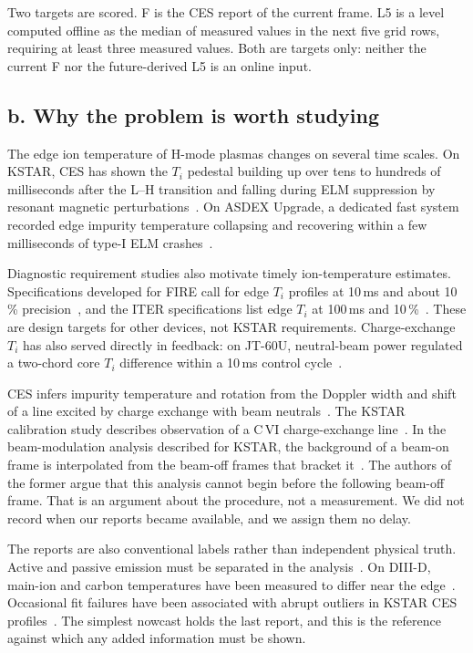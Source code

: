 \documentclass[11pt,a4paper]{article}
\begin{document}
Two targets are scored. F is the CES report of the current frame. L5 is a level computed offline as the median of measured values in the next five grid rows, requiring at least three measured values. Both are targets only: neither the current F nor the future-derived L5 is an online input.

\subsection*{b. Why the problem is worth studying}
The edge ion temperature of H-mode plasmas changes on several time scales. On KSTAR, CES has shown the $T_i$ pedestal building up over tens to hundreds of milliseconds after the L--H transition and falling during ELM suppression by resonant magnetic perturbations~\citep{Ko2015IonTemperature}. On ASDEX Upgrade, a dedicated fast system recorded edge impurity temperature collapsing and recovering within a few milliseconds of type-I ELM crashes~\citep{Viezzer2018IonHeat}.

Diagnostic requirement studies also motivate timely ion-temperature estimates. Specifications developed for FIRE call for edge $T_i$ profiles at 10\,ms and about 10\,\% precision~\citep{Young2008PlasmaMeasurements}, and the ITER specifications list edge $T_i$ at 100\,ms and 10\,\%~\citep{Donne2007ChapterDiagnostics}. These are design targets for other devices, not KSTAR requirements. Charge-exchange $T_i$ has also served directly in feedback: on JT-60U, neutral-beam power regulated a two-chord core $T_i$ difference within a 10\,ms control cycle~\citep{Yoshida2009RealTime}.

CES infers impurity temperature and rotation from the Doppler width and shift of a line excited by charge exchange with beam neutrals~\citep{Fonck1984DeterminationPlasma}. The KSTAR calibration study describes observation of a C\,VI charge-exchange line~\citep{Ko2010ChargeExchange}. In the beam-modulation analysis described for KSTAR, the background of a beam-on frame is interpolated from the beam-off frames that bracket it~\citep{Lee2020TwoGaussian,Lee2026NeuralNetworkbased}. The authors of the former argue that this analysis cannot begin before the following beam-off frame. That is an argument about the procedure, not a measurement. We did not record when our reports became available, and we assign them no delay.

The reports are also conventional labels rather than independent physical truth. Active and passive emission must be separated in the analysis~\citep{Viezzer2011PassiveEdge}. On DIII-D, main-ion and carbon temperatures have been measured to differ near the edge~\citep{Haskey2018MainIon}. Occasional fit failures have been associated with abrupt outliers in KSTAR CES profiles~\citep{Kim2024KineticProfile}. The simplest nowcast holds the last report, and this is the reference against which any added information must be shown.
\end{document}
